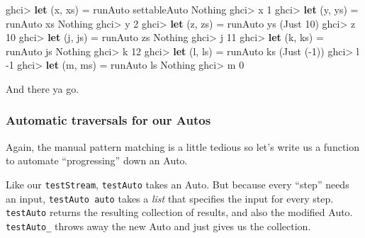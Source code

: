 \documentclass[]{article}
\newenvironment{Shaded}{}{}
\newcommand{\DataTypeTok}[1]{\textcolor[rgb]{0.56,0.13,0.00}{#1}}
\newcommand{\DecValTok}[1]{\textcolor[rgb]{0.25,0.63,0.44}{#1}}
\newcommand{\KeywordTok}[1]{\textcolor[rgb]{0.00,0.44,0.13}{\textbf{#1}}}
\newcommand{\NormalTok}[1]{#1}
\newcommand{\OperatorTok}[1]{\textcolor[rgb]{0.40,0.40,0.40}{#1}}
\newcommand{\OtherTok}[1]{\textcolor[rgb]{0.00,0.44,0.13}{#1}}
\begin{document}
\begin{Shaded}
\begin{Highlighting}[]
\NormalTok{ghci}\OperatorTok{\textgreater{}} \KeywordTok{let}\NormalTok{ (x, xs) }\OtherTok{=}\NormalTok{ runAuto settableAuto }\DataTypeTok{Nothing}
\NormalTok{ghci}\OperatorTok{\textgreater{}}\NormalTok{ x}
\DecValTok{1}
\NormalTok{ghci}\OperatorTok{\textgreater{}} \KeywordTok{let}\NormalTok{ (y, ys) }\OtherTok{=}\NormalTok{ runAuto xs }\DataTypeTok{Nothing}
\NormalTok{ghci}\OperatorTok{\textgreater{}}\NormalTok{ y}
\DecValTok{2}
\NormalTok{ghci}\OperatorTok{\textgreater{}} \KeywordTok{let}\NormalTok{ (z, zs) }\OtherTok{=}\NormalTok{ runAuto ys (}\DataTypeTok{Just} \DecValTok{10}\NormalTok{)}
\NormalTok{ghci}\OperatorTok{\textgreater{}}\NormalTok{ z}
\DecValTok{10}
\NormalTok{ghci}\OperatorTok{\textgreater{}} \KeywordTok{let}\NormalTok{ (j, js) }\OtherTok{=}\NormalTok{ runAuto zs }\DataTypeTok{Nothing}
\NormalTok{ghci}\OperatorTok{\textgreater{}}\NormalTok{ j}
\DecValTok{11}
\NormalTok{ghci}\OperatorTok{\textgreater{}} \KeywordTok{let}\NormalTok{ (k, ks) }\OtherTok{=}\NormalTok{ runAuto js }\DataTypeTok{Nothing}
\NormalTok{ghci}\OperatorTok{\textgreater{}}\NormalTok{ k}
\DecValTok{12}
\NormalTok{ghci}\OperatorTok{\textgreater{}} \KeywordTok{let}\NormalTok{ (l, ls) }\OtherTok{=}\NormalTok{ runAuto ks (}\DataTypeTok{Just}\NormalTok{ (}\OperatorTok{{-}}\DecValTok{1}\NormalTok{))}
\NormalTok{ghci}\OperatorTok{\textgreater{}}\NormalTok{ l}
\OperatorTok{{-}}\DecValTok{1}
\NormalTok{ghci}\OperatorTok{\textgreater{}} \KeywordTok{let}\NormalTok{ (m, ms) }\OtherTok{=}\NormalTok{ runAuto ls }\DataTypeTok{Nothing}
\NormalTok{ghci}\OperatorTok{\textgreater{}}\NormalTok{ m}
\DecValTok{0}
\end{Highlighting}
\end{Shaded}

And there ya go.

\subsubsection{Automatic traversals for our
Autos}\label{automatic-traversals-for-our-autos}

Again, the manual pattern matching is a little tedious so let's write us a
function to automate ``progressing'' down an Auto.

Like our \texttt{testStream}, \texttt{testAuto} takes an Auto. But because every
``step'' needs an input, \texttt{testAuto\ auto} takes a \emph{list} that
specifies the input for every step. \texttt{testAuto} returns the resulting
collection of results, and also the modified Auto. \texttt{testAuto\_} throws
away the new Auto and just gives us the collection.
\end{document}

